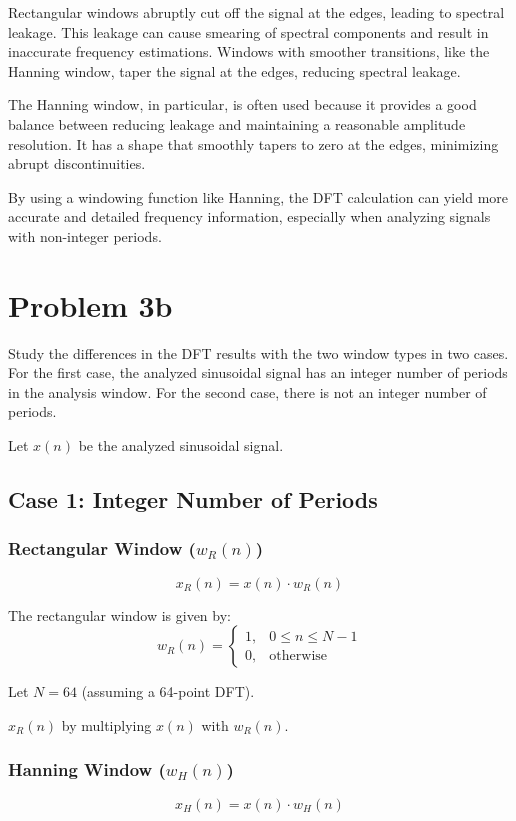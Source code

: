 \documentclass{article}
\begin{document}
Rectangular windows abruptly cut off the signal at the edges, leading to spectral leakage. This leakage can cause smearing of spectral components and result in inaccurate frequency estimations. Windows with smoother transitions, like the Hanning window, taper the signal at the edges, reducing spectral leakage.

The Hanning window, in particular, is often used because it provides a good balance between reducing leakage and maintaining a reasonable amplitude resolution. It has a shape that smoothly tapers to zero at the edges, minimizing abrupt discontinuities.

By using a windowing function like Hanning, the DFT calculation can yield more accurate and detailed frequency information, especially when analyzing signals with non-integer periods.



\section*{Problem 3b}
Study the differences in the DFT results with the two window types in two cases. For the first case, the analyzed sinusoidal signal has an integer number of periods in the analysis window. For the second case, there is not an integer number of periods.

Let \( x(n) \) be the analyzed sinusoidal signal.

\subsection*{Case 1: Integer Number of Periods}

\subsubsection*{Rectangular Window (\( w_R(n) \))}
\[ x_R(n) = x(n) \cdot w_R(n) \]

The rectangular window is given by:
\[ w_R(n) = \begin{cases} 1, & 0 \leq n \leq N-1 \\ 0, & \text{otherwise} \end{cases} \]

Let \( N = 64 \) (assuming a 64-point DFT).

 \( x_R(n) \) by multiplying \( x(n) \) with \( w_R(n) \).

\subsubsection*{Hanning Window (\( w_H(n) \))}
\[ x_H(n) = x(n) \cdot w_H(n) \]
\end{document}
